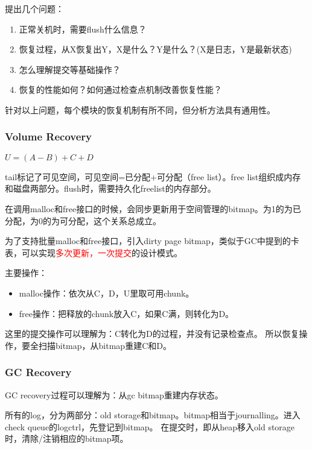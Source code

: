 \documentclass[UTF8]{ctexart}
\begin{document}
提出几个问题：
\begin{tcolorbox}
\begin{enumerate}
    \item 正常关机时，需要flush什么信息？
    \item 恢复过程，从X恢复出Y，X是什么？Y是什么？(X是日志，Y是最新状态)
    \item 怎么理解提交等基础操作？
    \item 恢复的性能如何？如何通过检查点机制改善恢复性能？
\end{enumerate}
\end{tcolorbox}

针对以上问题，每个模块的恢复机制有所不同，但分析方法具有通用性。

\subsubsection{Volume Recovery}

 $U = (A - B) + C + D$

tail标记了可见空间，可见空间=已分配+可分配（free list）。free list组织成内存和磁盘两部分。flush时，需要持久化freelist的内存部分。

在调用malloc和free接口的时候，会同步更新用于空间管理的bitmap。为1的为已分配，为0的为可分配，这个关系总成立。

为了支持批量malloc和free接口，引入dirty page bitmap，类似于GC中提到的卡表，可以实现\textcolor{red}{多次更新，一次提交}的设计模式。

主要操作：
\begin{tcolorbox}
\begin{itemize}
    \item malloc操作：依次从C，D，U里取可用chunk。
    \item free操作：把释放的chunk放入C，如果C满，则转化为D。
\end{itemize}
\end{tcolorbox}

这里的提交操作可以理解为：C转化为D的过程，并没有记录检查点。
所以恢复操作，要全扫描bitmap，从bitmap重建C和D。

\subsubsection{GC Recovery}

GC recovery过程可以理解为：从gc bitmap重建内存状态。

所有的log，分为两部分：old storage和bitmap。bitmap相当于journalling。进入check queue的logctrl，先登记到bitmap。
在提交时，即从heap移入old storage时，清除/注销相应的bitmap项。
\end{document}
